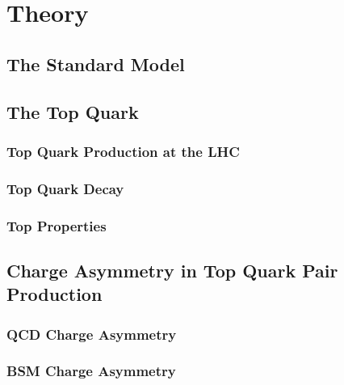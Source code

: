 \chapter{Theory}
\label{sec:theory}


\section{The Standard Model}
\label{sec:theSM}

\section{The Top Quark}
\label{sec:topquark}

\subsection{Top Quark Production at the LHC}
\label{sec:topprod}

\subsection{Top Quark Decay}
\label{sec:topdecay}

\subsection{Top Properties}
\label{sec:topdecay}

\section{Charge Asymmetry in Top Quark Pair Production}
\label{sec:topca}

\subsection{QCD Charge Asymmetry}
\label{sec:qcdca}

\subsection{BSM Charge Asymmetry}
\label{sec:qcdca}
